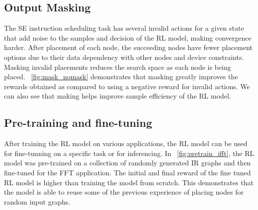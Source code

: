 

\subsection{Output Masking}
\label{subsec:output_masking}
The SE instruction scheduling task has several invalid actions for a given state that add noise to the samples and decision of the RL model, making convergence harder.
After placement of each node, the succeeding nodes have fewer placement options due to their data dependency with other nodes and device constraints.
Masking invalid placements reduces the search space as each node is being placed.
\figurename~\ref{fig:mask_nomask} demonstrates that masking greatly improves the rewards obtained as compared to using a negative reward for invalid actions. We can also see that making helps improve sample efficiency of the RL model.

\subsection{Pre-training and fine-tuning}
After training the RL model on various applications, the RL model can be used for fine-tunning on a specific task or for inferencing.
In \figurename~\ref{fig:pretrain_ifft}, the RL model was pre-trained on a collection of randomly generated IR graphs and then fine-tuned for the FFT application.
The initial and final reward of the fine tuned RL model is higher than training the model from scratch.
This demonstrates that the model is able to reuse some of the previous experience of placing nodes for random input graphs.